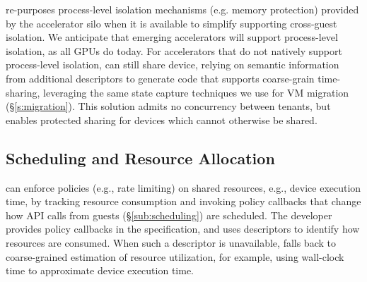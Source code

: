 \Model re-purposes process-level isolation mechanisms (e.g. memory protection)
provided by the accelerator silo when it is available to simplify supporting cross-guest
isolation. We anticipate that emerging accelerators will support process-level isolation, as all GPUs do today.
For accelerators that do not natively support process-level isolation,
\model can still share device, relying on semantic information from additional \speclang descriptors
to generate code that supports coarse-grain time-sharing, leveraging the same state capture techniques we use for VM migration (\S\ref{s:migration}).
This solution admits no concurrency between tenants, but enables protected
sharing for devices which cannot otherwise be shared.

\subsection{Scheduling and Resource Allocation}
\label{s:rate_limit}
\label{s:api_throttling}

\Model can enforce policies (e.g., rate limiting) on shared resources,
e.g., device execution time, by tracking resource consumption and invoking
policy callbacks that change how API calls from
guests (\S\ref{sub:scheduling}) are scheduled.
The developer provides policy callbacks in the \speclang specification, and uses descriptors to identify how resources are consumed.
When such a descriptor is unavailable, \model falls back to coarse-grained
estimation of resource utilization, for example, using wall-clock time to approximate device execution time.

